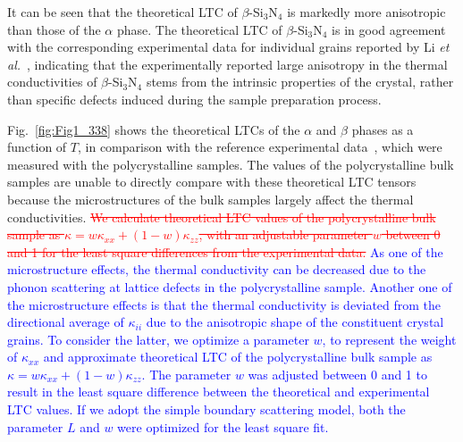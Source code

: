 \documentclass[twocolumn,amsmath,amssymb,a4paper,prb,superscriptaddress,floatfix]{revtex4-1}
\begin{document}
It can be seen that the theoretical LTC of $\beta$-Si$_3$N$_4$ is markedly
more anisotropic than those of the $\alpha$ phase. The theoretical LTC of
$\beta$-Si$_3$N$_4$ is in good agreement with the corresponding experimental
data for individual grains reported by Li {\it et al.}~\cite{li}, indicating
that the experimentally reported large anisotropy in the thermal conductivities
of $\beta$-Si$_3$N$_4$ stems from the intrinsic properties of the crystal,
rather than specific defects induced during the sample preparation process.

Fig.~\ref{fig:Fig1_338} shows the theoretical LTCs of the $\alpha$  and $\beta$
phases as a function of $T$, in comparison with the reference experimental
data~\cite{hirosaki,hirai,li}, which were measured with the polycrystalline
samples. The values of the polycrystalline bulk samples are unable to directly
compare with these theoretical LTC tensors because the microstructures of the
bulk samples largely affect the thermal conductivities.  \textcolor {red}{\sout
{We calculate theoretical LTC values of the polycrystalline bulk sample as
$\kappa = w\kappa_{xx} + (1-w) \kappa_{zz}$, with an adjustable parameter
$w$ between 0 and 1 for the least square differences from the experimental
data.}} \textcolor {blue} {As one of the microstructure effects, the thermal
conductivity  can be decreased due to the phonon scattering at lattice defects
in the polycrystalline sample. Another one of the microstructure effects is
that the thermal conductivity is deviated from the directional average of
$\kappa_{ii}$ due to the anisotropic shape of the constituent crystal grains.
To consider the latter, we optimize a parameter $w$, to represent the weight of
$\kappa_{xx}$ and approximate theoretical LTC of the polycrystalline bulk
sample as $\kappa = w\kappa_{xx} + (1-w) \kappa_{zz}$. The parameter $w$ was
adjusted between 0 and 1 to result in the least square difference between the
theoretical and experimental LTC values. If we adopt the simple boundary
scattering model, both the parameter $L$ and $w$ were optimized for the least
square fit.}
\end{document}
